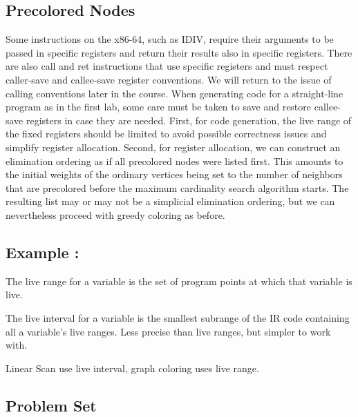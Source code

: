 \subsection{ Precolored Nodes}
Some instructions on the x86-64, such as IDIV, require their arguments to
be passed in specific registers and return their results also in specific registers. There are also call and ret instructions that use specific registers
and must respect caller-save and callee-save register conventions. We will
return to the issue of calling conventions later in the course. When generating code for a straight-line program as in the first lab, some care must be
taken to save and restore callee-save registers in case they are needed.
First, for code generation, the live range of the fixed registers should be
limited to avoid possible correctness issues and simplify register allocation.
Second, for register allocation, we can construct an elimination ordering as if all precolored nodes were listed first. This amounts to the initial weights of the ordinary vertices being set to the number of neighbors
that are precolored before the maximum cardinality search algorithm starts.
The resulting list may or may not be a simplicial elimination ordering, but
we can nevertheless proceed with greedy coloring as before.



\subsection{Example : }

The live range for a variable is the set of program
points at which that variable is live.

The live interval for a variable is the smallest
subrange of the IR code containing all a variable's
live ranges. Less precise than live ranges, but simpler to work with.

Linear Scan use live interval, graph coloring uses live range.


\subsection{Problem Set}

